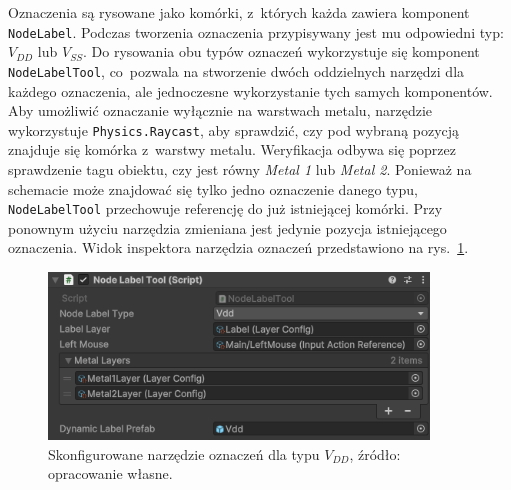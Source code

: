 Oznaczenia są rysowane jako komórki,
z~których każda zawiera komponent \texttt{NodeLabel}.
Podczas tworzenia oznaczenia przypisywany jest mu odpowiedni typ: $V_{DD}$ lub $V_{SS}$.
Do rysowania obu typów oznaczeń wykorzystuje się komponent \texttt{NodeLabelTool},
co~pozwala na stworzenie dwóch oddzielnych narzędzi dla każdego oznaczenia,
ale jednoczesne wykorzystanie tych samych komponentów.
Aby umożliwić oznaczanie wyłącznie na warstwach metalu, narzędzie wykorzystuje \texttt{Physics.Raycast},
aby sprawdzić, czy pod wybraną pozycją znajduje się komórka z~warstwy metalu.
Weryfikacja odbywa się poprzez sprawdzenie tagu obiektu, czy jest równy \textit{Metal 1} lub \textit{Metal 2}.
Ponieważ na schemacie może znajdować się tylko jedno oznaczenie danego typu,
\texttt{NodeLabelTool} przechowuje referencję do już istniejącej komórki.
Przy ponownym użyciu narzędzia zmieniana jest jedynie pozycja istniejącego oznaczenia.
Widok inspektora narzędzia oznaczeń przedstawiono na rys.~\ref{fig:label}.

\begin{figure}[h!]
    \centering
    \includegraphics[width=0.9\textwidth]{chapters/chapter4/rys/tools/node_label_tool}
    \caption[Skonfigurowane narzędzie oznaczeń dla typu $V_{DD}$.]
    {Skonfigurowane narzędzie oznaczeń dla typu $V_{DD}$, źródło: opracowanie własne.}
    \label{fig:label}
\end{figure}


